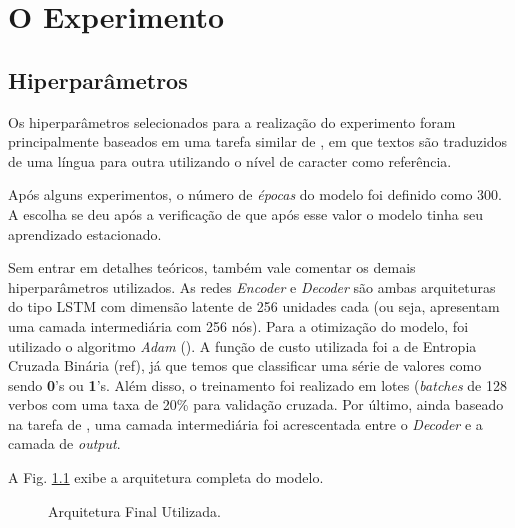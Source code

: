 \chapter{O Experimento}
\label{ch:07}


\section{Hiperparâmetros}
\label{sec:treinamento}

Os hiperparâmetros selecionados para a realização do experimento foram principalmente baseados em uma tarefa similar de \cite{cholletseq2seq}, em que textos são traduzidos de uma língua para outra utilizando o nível de caracter como referência.

Após alguns experimentos, o número de \textit{épocas} do modelo foi definido como 300. A escolha se deu após a verificação de que após esse valor o modelo tinha seu aprendizado estacionado.

Sem entrar em detalhes teóricos, também vale comentar os demais hiperparâmetros utilizados. As redes \textit{Encoder} e \textit{Decoder} são ambas arquiteturas do tipo LSTM com dimensão latente de 256 unidades cada (ou seja, apresentam uma camada intermediária com 256 nós). Para a otimização do modelo, foi utilizado o algoritmo \textit{Adam} (\cite{adam:2014}). A função de custo utilizada foi a de Entropia Cruzada Binária (ref), já que temos que classificar uma série de valores como sendo \textbf{0}'s ou \textbf{1}'s. Além disso, o treinamento foi realizado em lotes (\textit{batches} de 128 verbos com uma taxa de 20\% para validação cruzada. Por último, ainda baseado na tarefa de \cite{cholletseq2seq}, uma camada intermediária foi acrescentada entre o \textit{Decoder} e a camada de \textit{output}.

A Fig. \ref{fig:encoder-decoder} exibe a arquitetura completa do modelo.

\begin{figure}[!htb]
\caption{\label{fig:encoder-decoder} Arquitetura Final Utilizada.}
\end{figure}

